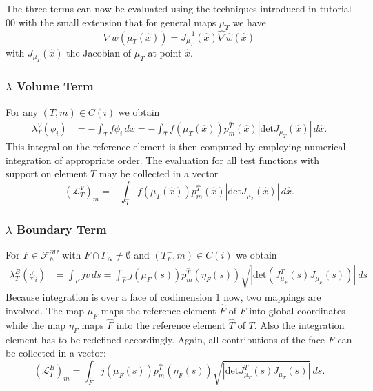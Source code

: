 \documentclass[a4paper,12pt]{article}
\begin{document}
The three terms can now be evaluated using the techniques introduced in 
tutorial 00 with the small extension that for general maps $\mu_T$ we
have 
$$\nabla w(\mu_T(\hat x)) = J_{\mu_T}^{-1}(\hat x) \hat\nabla \hat w (\hat x)$$
with $J_{\mu_T}(\hat x)$ the Jacobian of $\mu_T$ at point $\hat x$.

\subsubsection*{$\lambda$ Volume Term}

For any $(T,m)\in C(i)$ we obtain
\begin{equation*}
\begin{split}
\lambda_T^V(\phi_i) &= - \int_T f \phi_i \,dx = 
- \int_{\hat T} f(\mu_T(\hat x)) p_m^{\hat T}(\hat x) |\text{det} J_{\mu_T}(\hat x)|\, d\hat x .
\end{split}
\end{equation*}
This integral on the reference element is then computed by employing
numerical integration of appropriate order.
The evaluation for all test functions with support on element $T$ may be collected in
a vector 
\begin{equation*}
(\mathcal{L}_T^V)_m = - \int_{\hat T} f(\mu_T(\hat x)) p_m^{\hat T}(\hat x) 
|\text{det} J_{\mu_T}(\hat x)|\, d\hat x.
\end{equation*}

\subsubsection*{$\lambda$ Boundary Term}

For $F\in\mathcal{F}_h^{\partial\Omega}$ with $F\cap\Gamma_N\neq\emptyset$
and $(T_F^-,m)\in C(i)$ we obtain
\begin{equation*}
\begin{split}
\lambda_T^B(\phi_i) &= \int_{F} j v\,ds = 
\int_{\hat F} j(\mu_F(s)) p_m^{\hat T}(\eta_F(s)) 
\sqrt{|\text{det} (J^T_{\mu_F}(s)J_{\mu_F}(s))|} \,ds
\end{split}
\end{equation*}
Because integration is over a face of codimension 1 now, two mappings are
involved. The map $\mu_F$ maps the reference element $\hat F$ of $F$ into
global coordinates while the map $\eta_F$ maps $\hat F$ into the reference
element $\hat T$ of $T$. Also the integration element has to be redefined accordingly.
Again, all contributions of the face $F$ can be collected in a vector:
\begin{equation*}
(\mathcal{L}_T^B)_m = 
\int_{\hat F} j(\mu_F(s)) p_m^{\hat T}(\eta_F(s)) 
\sqrt{|\text{det} J^T_{\mu_T}(s)J_{\mu_T}(s)|} \,ds .
\end{equation*}
\end{document}

